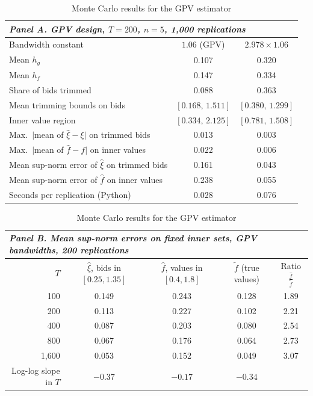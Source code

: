 \begin{table}[htbp]
\centering
\caption{Monte Carlo results for the GPV estimator}\label{tab:15-gpv-mc}
\small
\begin{tabular}{lcc}
\toprule
\multicolumn{3}{l}{\textit{Panel A. GPV design, $T=200$, $n=5$, 1,000 replications}}\\
\midrule
Bandwidth constant & $1.06$ (GPV) & $2.978\times1.06$ \\
\midrule
Mean $h_g$ & 0.107 & 0.320\\
Mean $h_f$ & 0.147 & 0.334\\
Share of bids trimmed & 0.088 & 0.363\\
Mean trimming bounds on bids & $[0.168,\,1.511]$ & $[0.380,\,1.299]$\\
Inner value region & $[0.334,\,2.125]$ & $[0.781,\,1.508]$\\
Max.\ $|$mean of $\hat\xi-\xi|$ on trimmed bids & 0.013 & 0.003\\
Max.\ $|$mean of $\hat f-f|$ on inner values & 0.022 & 0.006\\
Mean sup-norm error of $\hat\xi$ on trimmed bids & 0.161 & 0.043\\
Mean sup-norm error of $\hat f$ on inner values & 0.238 & 0.055\\
Seconds per replication (Python) & 0.028 & 0.076\\
\bottomrule
\end{tabular}

\medskip
\begin{tabular}{rcccc}
\toprule
\multicolumn{5}{l}{\textit{Panel B. Mean sup-norm errors on fixed inner sets, GPV bandwidths, 200 replications}}\\
\midrule
$T$ & \makecell{$\hat\xi$, bids\\ in $[0.25,1.35]$} & \makecell{$\hat f$, values\\ in $[0.4,1.8]$} & \makecell{$\tilde f$\\ (true values)} & Ratio $\frac{\hat f}{\tilde f}$\\
\midrule
100 & 0.149 & 0.243 & 0.128 & 1.89\\
200 & 0.113 & 0.227 & 0.102 & 2.21\\
400 & 0.087 & 0.203 & 0.080 & 2.54\\
800 & 0.067 & 0.176 & 0.064 & 2.73\\
1,600 & 0.053 & 0.152 & 0.049 & 3.07\\
\midrule
Log-log slope in $T$ & $-0.37$ & $-0.17$ & $-0.34$ & \\
\bottomrule
\end{tabular}


\end{table}
